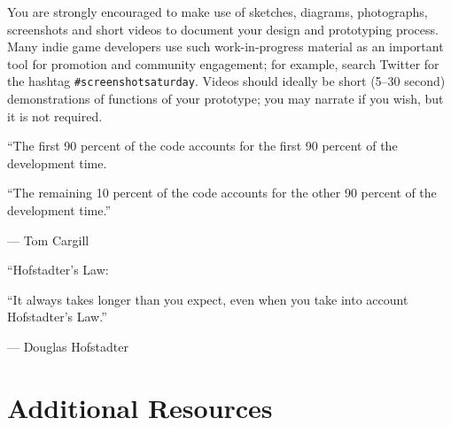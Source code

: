 \documentclass{../fal_assignment}
\begin{document}
You are strongly encouraged to make use of sketches, diagrams, photographs, screenshots
and short videos to document your design and prototyping process.
Many indie game developers use such work-in-progress material as an important tool for promotion
and community engagement; for example, search Twitter for the hashtag \texttt{\#screenshotsaturday}.
Videos should ideally be short (5--30 second) demonstrations of functions of your prototype;
you may narrate if you wish, but it is not required.

\begin{marginquote}
    ``The first 90 percent of the code accounts for the first 90 percent of the development time.
    
    ``The remaining 10 percent of the code accounts for the other 90 percent of the development time.''
    
    --- Tom Cargill
    
    \marginquoterule
    
    ``Hofstadter's Law:
    
    ``It always takes longer than you expect, even when you take into account Hofstadter's Law.''
    
    --- Douglas Hofstadter
\end{marginquote}
\section*{Additional Resources}
\end{document}
